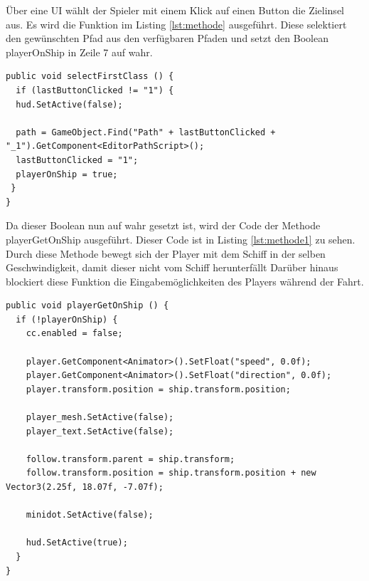 			Über eine \ac{UI} wählt der Spieler mit einem Klick auf einen Button die Zielinsel aus. Es wird die Funktion im Listing \ref{lst:methode} ausgeführt. Diese selektiert den gewünschten Pfad aus den verfügbaren Pfaden und setzt den Boolean playerOnShip in Zeile 7 auf wahr. 

\begin{scriptsize}
\lstset{
	float,
	caption=Methode: selectFirstClass, 
	language=[Sharp]C, 
	frame=single,  
	showstringspaces=false, 
	showspaces=false, 
	numbers=left, 
	captionpos=b, 
	belowcaptionskip=4pt,
	basicstyle=\ttfamily
} 
\begin{lstlisting}[label=lst:methode]
public void selectFirstClass () {
  if (lastButtonClicked != "1") {
  hud.SetActive(false);
  
  path = GameObject.Find("Path" + lastButtonClicked + "_1").GetComponent<EditorPathScript>();
  lastButtonClicked = "1";
  playerOnShip = true;
 }
}
\end{lstlisting}
\end{scriptsize}

			Da dieser Boolean nun auf wahr gesetzt ist, wird der Code der Methode playerGetOnShip ausgeführt. Dieser Code ist in Listing \ref{lst:methode1} zu sehen. Durch diese Methode bewegt sich der Player mit dem Schiff in der selben Geschwindigkeit, damit dieser nicht vom Schiff herunterfällt Darüber hinaus blockiert diese Funktion die Eingabemöglichkeiten des Players während der Fahrt.

\begin{scriptsize}
\lstset{
	float,
	caption=Methode: playerGetOnShip, 
	language=[Sharp]C, 
	frame=single,  
	showstringspaces=false, 
	showspaces=false, 
	numbers=left, 
	captionpos=b, 
	belowcaptionskip=4pt,
	basicstyle=\ttfamily
} 
\begin{lstlisting}[label=lst:methode1]
public void playerGetOnShip () {
  if (!playerOnShip) {
    cc.enabled = false;

    player.GetComponent<Animator>().SetFloat("speed", 0.0f);
    player.GetComponent<Animator>().SetFloat("direction", 0.0f);
    player.transform.position = ship.transform.position;

    player_mesh.SetActive(false);
    player_text.SetActive(false);

    follow.transform.parent = ship.transform;
    follow.transform.position = ship.transform.position + new Vector3(2.25f, 18.07f, -7.07f);

    minidot.SetActive(false);

    hud.SetActive(true);
  }
}
\end{lstlisting}
\end{scriptsize}

